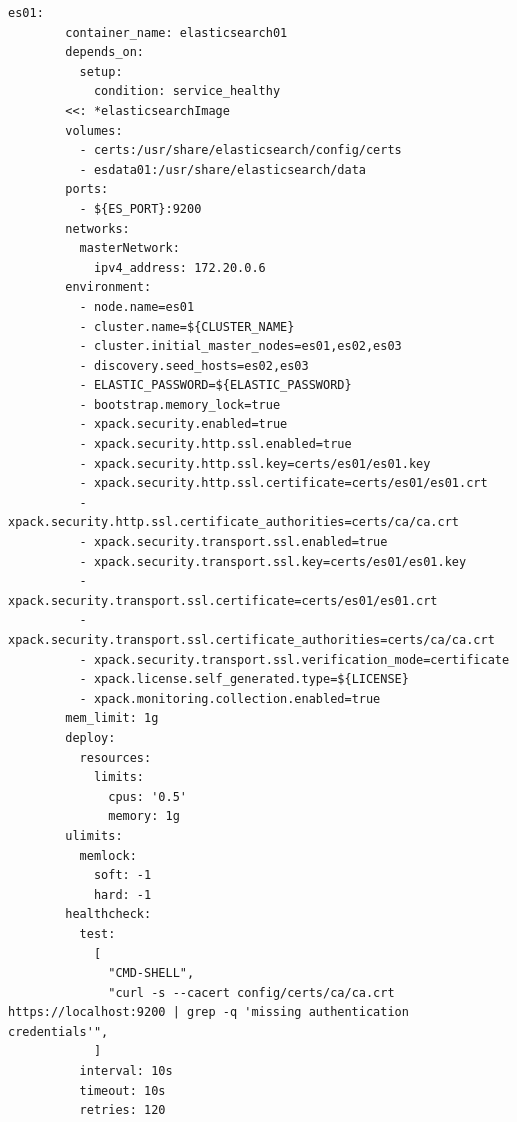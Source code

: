 \begin{lstlisting}[caption=Plik docker-comose.yml, label=dockerComposeFile]
      es01:
        container_name: elasticsearch01
        depends_on:
          setup:
            condition: service_healthy
        <<: *elasticsearchImage
        volumes:
          - certs:/usr/share/elasticsearch/config/certs
          - esdata01:/usr/share/elasticsearch/data
        ports:
          - ${ES_PORT}:9200
        networks:
          masterNetwork:
            ipv4_address: 172.20.0.6
        environment:
          - node.name=es01
          - cluster.name=${CLUSTER_NAME}
          - cluster.initial_master_nodes=es01,es02,es03
          - discovery.seed_hosts=es02,es03
          - ELASTIC_PASSWORD=${ELASTIC_PASSWORD}
          - bootstrap.memory_lock=true
          - xpack.security.enabled=true
          - xpack.security.http.ssl.enabled=true
          - xpack.security.http.ssl.key=certs/es01/es01.key
          - xpack.security.http.ssl.certificate=certs/es01/es01.crt
          - xpack.security.http.ssl.certificate_authorities=certs/ca/ca.crt
          - xpack.security.transport.ssl.enabled=true
          - xpack.security.transport.ssl.key=certs/es01/es01.key
          - xpack.security.transport.ssl.certificate=certs/es01/es01.crt
          - xpack.security.transport.ssl.certificate_authorities=certs/ca/ca.crt
          - xpack.security.transport.ssl.verification_mode=certificate
          - xpack.license.self_generated.type=${LICENSE}
          - xpack.monitoring.collection.enabled=true
        mem_limit: 1g
        deploy:
          resources:
            limits:
              cpus: '0.5'
              memory: 1g
        ulimits:
          memlock:
            soft: -1
            hard: -1
        healthcheck:
          test:
            [
              "CMD-SHELL",
              "curl -s --cacert config/certs/ca/ca.crt https://localhost:9200 | grep -q 'missing authentication credentials'",
            ]
          interval: 10s
          timeout: 10s
          retries: 120
    

\end{lstlisting}
